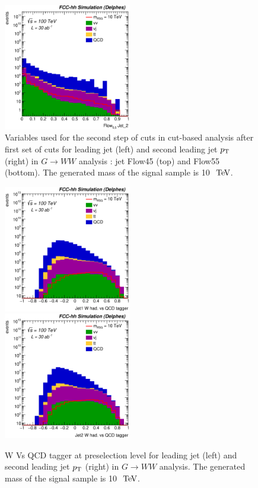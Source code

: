 \documentclass{cernrep}
\begin{document}
\begin{figure}[!htb]
\includegraphics[width=0.495\textwidth]{Fig/RSGww/Jet2_Flow55_sel1_nostack_log.eps}
\caption{Variables used for the second step of cuts in cut-based analysis after first set of cuts for leading jet (left) and second leading jet $p\sb{\scriptstyle\mathrm{T}}$ (right) in $G \rightarrow WW$ analysis : jet Flow45 (top) and Flow55 (bottom). The generated mass of the signal sample is 10 $\TeV$.}
\label{fig:RSGww_sel1_cut}
\end{figure}

\begin{figure}[!htb]\centering
\includegraphics[width=0.495\textwidth]{Fig/RSGww/Jet1_Whad_vs_QCD_tagger_sel0_nostack_log.eps}
\includegraphics[width=0.495\textwidth]{Fig/RSGww/Jet2_Whad_vs_QCD_tagger_sel0_nostack_log.eps}
\caption{W Vs QCD tagger at preselection level for leading jet (left) and second leading jet $p\sb{\scriptstyle\mathrm{T}}$ (right) in $G \rightarrow WW$ analysis. The generated mass of the signal sample is 10 $\TeV$.}
\label{fig:RSGww_sel0_tagger}
\end{figure}
\end{document}

